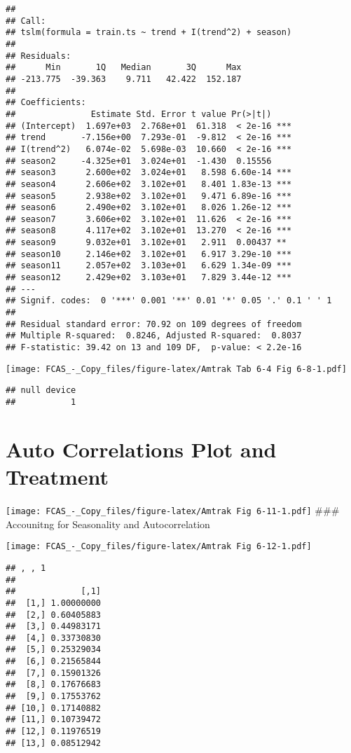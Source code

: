 \documentclass[]{article}
\begin{document}
\begin{verbatim}
## 
## Call:
## tslm(formula = train.ts ~ trend + I(trend^2) + season)
## 
## Residuals:
##      Min       1Q   Median       3Q      Max 
## -213.775  -39.363    9.711   42.422  152.187 
## 
## Coefficients:
##               Estimate Std. Error t value Pr(>|t|)    
## (Intercept)  1.697e+03  2.768e+01  61.318  < 2e-16 ***
## trend       -7.156e+00  7.293e-01  -9.812  < 2e-16 ***
## I(trend^2)   6.074e-02  5.698e-03  10.660  < 2e-16 ***
## season2     -4.325e+01  3.024e+01  -1.430  0.15556    
## season3      2.600e+02  3.024e+01   8.598 6.60e-14 ***
## season4      2.606e+02  3.102e+01   8.401 1.83e-13 ***
## season5      2.938e+02  3.102e+01   9.471 6.89e-16 ***
## season6      2.490e+02  3.102e+01   8.026 1.26e-12 ***
## season7      3.606e+02  3.102e+01  11.626  < 2e-16 ***
## season8      4.117e+02  3.102e+01  13.270  < 2e-16 ***
## season9      9.032e+01  3.102e+01   2.911  0.00437 ** 
## season10     2.146e+02  3.102e+01   6.917 3.29e-10 ***
## season11     2.057e+02  3.103e+01   6.629 1.34e-09 ***
## season12     2.429e+02  3.103e+01   7.829 3.44e-12 ***
## ---
## Signif. codes:  0 '***' 0.001 '**' 0.01 '*' 0.05 '.' 0.1 ' ' 1
## 
## Residual standard error: 70.92 on 109 degrees of freedom
## Multiple R-squared:  0.8246, Adjusted R-squared:  0.8037 
## F-statistic: 39.42 on 13 and 109 DF,  p-value: < 2.2e-16
\end{verbatim}

\texttt{[image: FCAS\_-\_Copy\_files/figure-latex/Amtrak Tab 6-4 Fig 6-8-1.pdf]}

\begin{verbatim}
## null device 
##           1
\end{verbatim}

\section{Auto Correlations Plot and
Treatment}\label{auto-correlations-plot-and-treatment}

\texttt{[image: FCAS\_-\_Copy\_files/figure-latex/Amtrak Fig 6-11-1.pdf]}
\#\#\# Accounitng for Seasonality and Autocorrelation

\texttt{[image: FCAS\_-\_Copy\_files/figure-latex/Amtrak Fig 6-12-1.pdf]}

\begin{verbatim}
## , , 1
## 
##             [,1]
##  [1,] 1.00000000
##  [2,] 0.60405883
##  [3,] 0.44983171
##  [4,] 0.33730830
##  [5,] 0.25329034
##  [6,] 0.21565844
##  [7,] 0.15901326
##  [8,] 0.17676683
##  [9,] 0.17553762
## [10,] 0.17140882
## [11,] 0.10739472
## [12,] 0.11976519
## [13,] 0.08512942
\end{verbatim}
\end{document}
